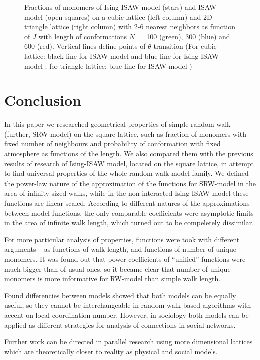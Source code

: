 \documentclass[a4paper]{jpconf}
\begin{document}
\begin{figure}
    \caption{Fractions of monomers of Ising-ISAW model (stars) and ISAW model (open squares) on a cubic lattice (left column) and 2D-triangle lattice (right column) with 2-6 nearest neighbors as function of $J$ with length of conformations $N = $ 100 (green), 300 (blue) and 600 (red). Vertical lines define points of $\theta$-transition (For cubic lattice: black line for ISAW model \cite{Tesi1996} and blue line for Ising-ISAW model \cite{Foster2021}; for triangle lattice: blue line for ISAW model \cite{Privman1986})}
    \label{fig:Ising_vs_ISAW}
\end{figure}

\section{Conclusion}

In this paper we researched geometrical properties of simple random walk (further, SRW model) on the square lattice, such as fraction of monomers with fixed number of neighbours and probability of conformation with fixed atmosphere as functions of the length. We also compared them with the previous results of research of Ising-ISAW model, located on the square lattice, in attempt to find universal properties of the whole random walk model family. We defined the power-law nature of the approximation of the functions for SRW-model in the area of infinity sized walks, while in the non-interacted Ising-ISAW model these functions are linear-scaled. According to different natures of the approximations between model functions, the only comparable coefficients were asymptotic limits in the area of infinite walk length, which turned out to be compeletely dissimilar.

For more particular analysis of properties, functions were took with different arguments – as functions of walk-length, and functions of number of unique monomers. It was found out that power coefficients of “unified” functions were much bigger than of usual ones, so it became clear that number of unique monomers is more informative for RW-model than simple walk length.

Found differencies between models showed that both models can be equally useful, so they cannot be interchangeable in random walk based algorithms with accent on local coordination number. However, in sociology both models can be applied as different strategies for analysis of connections in social networks.

Further work can be directed in parallel research using more dimensional lattices which are theoretically closer to reality as physical and social models.


\end{document}
